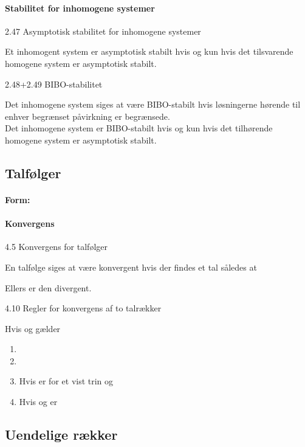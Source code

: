 \documentclass[
]{article}
\begin{document}
\paragraph{Stabilitet for inhomogene
systemer}\label{stabilitet-for-inhomogene-systemer}

2.47 Asymptotisk stabilitet for inhomogene systemer

Et inhomogent system {} er asymptotisk stabilt hvis og kun hvis det
tilsvarende homogene system er asymptotisk stabilt.

2.48+2.49 BIBO-stabilitet

Det inhomogene system {} siges at være BIBO-stabilt hvis løsningerne {}
hørende til enhver begrænset påvirkning {} er begrænsede.\\
Det inhomogene system er BIBO-stabilt hvis og kun hvis det tilhørende
homogene system er asymptotisk stabilt.

\subsection{Talfølger}\label{talfuxf8lger}

\paragraph{Form:}\label{form-2}

\paragraph{Konvergens}\label{konvergens}

4.5 Konvergens for talfølger

En talfølge {} siges at være konvergent hvis der findes et tal {}
således at

Ellers er den divergent.

4.10 Regler for konvergens af to talrækker

Hvis {} og {} gælder

\begin{enumerate}
\item
\item
\item
  Hvis {} er {} for et vist trin og
\item
  Hvis {} og {} er {}
\end{enumerate}

\subsection{Uendelige rækker}\label{uendelige-ruxe6kker}
\end{document}
